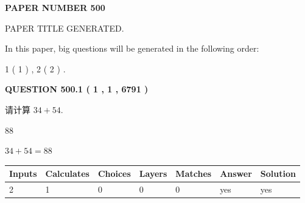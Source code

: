 \documentclass{ctexart}
\begin{document}
   
 {\textbf{ \Large{ PAPER NUMBER  500  }}}
   
   
\vspace{0.2in}
   
   
   
   
   
   
   
   
 \vspace{0.2in}
 
 
 
 
   
   
 PAPER TITLE GENERATED.
   
   
   
\vspace{0.2in}
   
In this paper, big questions will be generated in the following order: 
   
   
   1 ( 1 )
 ,
   2 ( 2 )
 .
  
\vspace{0.2in}
  
{\textbf{\Large{QUESTION
500.1 
 ( 1 , 1 , 6791 )
}}}
  
  
 
请计算 $ %
34 +  %
54 $.
 
 
 
\noindent{}
 
 

88
 
 
\noindent{}
 
 

 
 
 
\noindent{}
 
 

$ %
34 +  %
54=   %
88$
 
 
\noindent{}
 
 

 
   
   
   
   
\noindent\begin{tabular}{|l|l|l|l|l|l|l|}
 \hline
Inputs & Calculates & Choices & Layers & Matches & Answer & Solution \\ \hline
 2  & 
 1  & 
 0
  & 
 0  & 
 0  & 
  yes & 
  yes 
  \\ \hline
 \end{tabular}
   
\end{document}
